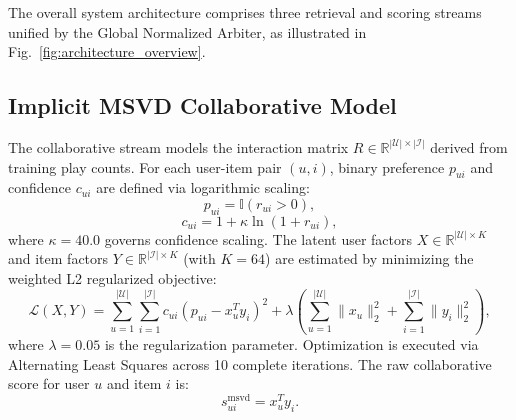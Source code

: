 \documentclass[conference]{IEEEtran}
\begin{document}
The overall system architecture comprises three retrieval and scoring streams unified by the Global Normalized Arbiter, as illustrated in Fig.~\ref{fig:architecture_overview}.

\subsection{Implicit MSVD Collaborative Model}
The collaborative stream models the interaction matrix $R \in \mathbb{R}^{|\mathcal{U}| \times |\mathcal{I}|}$ derived from training play counts. For each user-item pair $(u, i)$, binary preference $p_{ui}$ and confidence $c_{ui}$ are defined via logarithmic scaling:
\begin{equation}
p_{ui} = \mathbb{I}(r_{ui} > 0),
\end{equation}
\begin{equation}
c_{ui} = 1 + \kappa \ln(1 + r_{ui}),
\end{equation}
where $\kappa = 40.0$ governs confidence scaling. The latent user factors $X \in \mathbb{R}^{|\mathcal{U}| \times K}$ and item factors $Y \in \mathbb{R}^{|\mathcal{I}| \times K}$ (with $K = 64$) are estimated by minimizing the weighted L2 regularized objective:
\begin{equation}
\mathcal{L}(X, Y) = \sum_{u=1}^{|\mathcal{U}|} \sum_{i=1}^{|\mathcal{I}|} c_{ui} \left( p_{ui} - x_u^T y_i \right)^2 + \lambda \left( \sum_{u=1}^{|\mathcal{U}|} \|x_u\|_2^2 + \sum_{i=1}^{|\mathcal{I}|} \|y_i\|_2^2 \right),
\end{equation}
where $\lambda = 0.05$ is the regularization parameter. Optimization is executed via Alternating Least Squares across 10 complete iterations. The raw collaborative score for user $u$ and item $i$ is:
\begin{equation}
s_{ui}^{\text{msvd}} = x_u^T y_i.
\end{equation}
\end{document}
